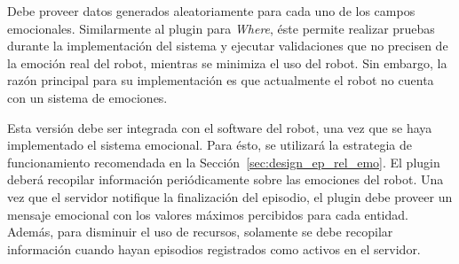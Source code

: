 Debe proveer datos generados aleatoriamente para cada uno de los campos emocionales. Similarmente al plugin para \textit{Where}, éste permite realizar pruebas durante la implementación del sistema y ejecutar validaciones que no precisen de la emoción real del robot, mientras se minimiza el uso del robot. Sin embargo, la razón principal para su implementación es que actualmente el robot no cuenta con un sistema de emociones.

Esta versión debe ser integrada con el software del robot, una vez que se haya implementado el sistema emocional. Para ésto, se utilizará la estrategia de funcionamiento recomendada en la Sección~\ref{sec:design_ep_rel_emo}. El plugin deberá recopilar información periódicamente sobre las emociones del robot. Una vez que el servidor notifique la finalización del episodio, el plugin debe proveer un mensaje emocional con los valores máximos percibidos para cada entidad. Además, para disminuir el uso de recursos, solamente se debe recopilar información cuando hayan episodios registrados como activos en el servidor.

%
%
%


